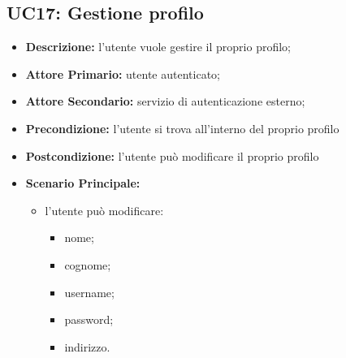 \subsection{UC17: Gestione profilo}
\label{sec:UC17}
\begin{itemize}
    \item \textbf{Descrizione:} l'utente vuole gestire il proprio profilo;
    \item \textbf{Attore Primario:} utente autenticato;
    \item \textbf{Attore Secondario:} servizio di autenticazione esterno;
    \item \textbf{Precondizione:} l'utente si trova all'interno del proprio profilo
    \item \textbf{Postcondizione:} l'utente può modificare il proprio profilo
    \item \textbf{Scenario Principale:}
          \begin{itemize}
              \item  l'utente può modificare:
                    \begin{itemize}
                        \item nome;
                        \item cognome;
                        \item username;
                        \item password;
                        \item indirizzo.
                    \end{itemize}
          \end{itemize}
\end{itemize}